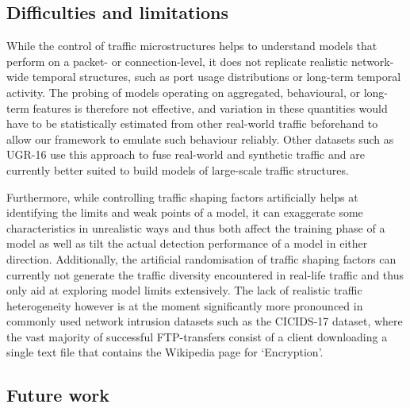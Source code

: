 \documentclass[runningheads]{llncs}
\begin{document}

\subsection{Difficulties and limitations}

While the control of traffic microstructures helps to understand models that perform on a packet- or connection-level, it does not replicate realistic network-wide temporal structures, such as port usage distributions or long-term temporal activity. The probing of models operating on aggregated, behavioural, or long-term features is therefore not effective, and variation in these quantities would have to be statistically estimated from other real-world traffic beforehand to allow our framework to emulate such behaviour reliably. Other datasets such as UGR-16 \cite{macia2018ugr} use this approach to fuse real-world and synthetic traffic and are currently better suited to build models of large-scale traffic structures.

Furthermore, while controlling traffic shaping factors artificially helps at identifying the limits and weak points of a model, it can exaggerate some characteristics in unrealistic ways and thus both affect the training phase of a model as well as tilt the actual detection performance of a model in either direction. Additionally, the artificial randomisation of traffic shaping factors can currently not generate the traffic diversity encountered in real-life traffic and thus only aid at exploring model limits extensively. The lack of realistic traffic heterogeneity however is at the moment significantly more pronounced in commonly used network intrusion datasets such as the CICIDS-17 dataset, where the vast majority of successful FTP-transfers consist of a client downloading a single text file that contains the Wikipedia page for ‘Encryption’.

\subsection{Future work}
\end{document}
